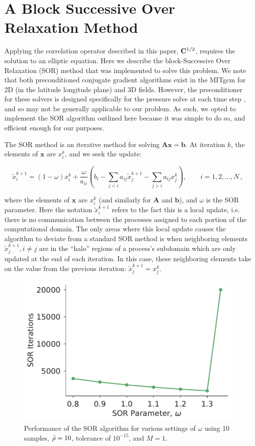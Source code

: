 \section{A Block Successive Over Relaxation Method}
\label{sec:block_sor}

Applying the correlation operator described in this paper, $\mathbf{C}^{1/2}$,
requires the solution to an elliptic equation.
Here we describe the block-Successive Over Relaxation (SOR) method that was
implemented to solve this problem.
We note that both preconditioned conjugate gradient algorithms exist in the
MITgcm for 2D (in the latitude longitude plane) and 3D fields.
However, the preconditioner for these solvers is designed specifically for the
pressure solve at each time step \citep{marshall_finite-volume_1997},
and so may not be generally applicable to our problem.
As such, we opted to implement the SOR algorithm outlined here because it was
simple to do so, and efficient enough for our purposes.

The SOR method is an iterative method for solving $\mathbf{A}\mathbf{x} = \mathbf{b}$.
At iteration $k$, the elements of $\mathbf{x}$ are $x_i^k$, and we seek the update:
\begin{linenomath*}\begin{equation}
    \tilde{x}_i^{k+1} = (1-\omega) x_i^k + \dfrac{\omega}{a_{ii}}
    \left( b_i - \sum_{j<i}a_{ij}\tilde{x}_j^{k+1} -
        \sum_{j>i}a_{ij}x_j^{k}\right), \qquad
        i=1,2,...,N \, ,
    \label{eq:sor_update}
\end{equation}\end{linenomath*}
where the elements of $\mathbf{x}$ are $x_i^k$ (and similarly for $\mathbf{A}$
and $\mathbf{b}$), and $\omega$ is the SOR parameter.
Here the notation $\tilde{x}_i^{k+1}$ refers to the fact this is a local update,
i.e. there is no communication between the processes assigned to each portion of
the computational domain.
The only areas where this local update causes the algorithm to deviate from a
standard SOR method is when neighboring elements
$\tilde{x}^{k+1}_{j}, i\ne j$ are in the ``halo'' regions of a process's
subdomain which are only updated at the end of each iteration.
In this case, these neighboring elements take on the value from the previous
iteration: $\tilde{x}^{k+1}_j = x^k_j$.

\begin{figure}
    \centering
    \includegraphics[width=.5\textwidth]{../figures/sor_parameter.pdf}
    \caption{Performance of the SOR algorithm for various settings of $\omega$
        using 10 samples, $\hat{\rho}=10$, tolerance of $10^{-15}$, and $M=1$.
    }
    \label{fig:sor}
\end{figure}

